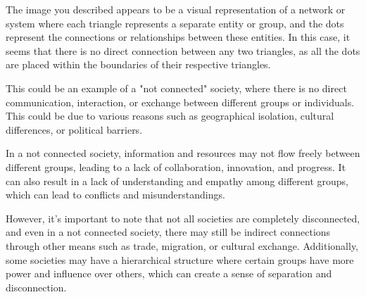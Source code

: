 The image you described appears to be a visual representation of a network or system where each triangle represents a separate entity or group, and the dots represent the connections or relationships between these entities. In this case, it seems that there is no direct connection between any two triangles, as all the dots are placed within the boundaries of their respective triangles.

This could be an example of a "not connected" society, where there is no direct communication, interaction, or exchange between different groups or individuals. This could be due to various reasons such as geographical isolation, cultural differences, or political barriers.

In a not connected society, information and resources may not flow freely between different groups, leading to a lack of collaboration, innovation, and progress. It can also result in a lack of understanding and empathy among different groups, which can lead to conflicts and misunderstandings.

However, it's important to note that not all societies are completely disconnected, and even in a not connected society, there may still be indirect connections through other means such as trade, migration, or cultural exchange. Additionally, some societies may have a hierarchical structure where certain groups have more power and influence over others, which can create a sense of separation and disconnection.